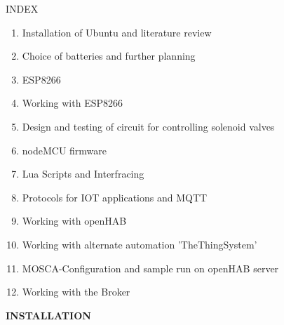 \documentclass[16pt]{article}
\begin{document}
\begin{tabbing}
	\hspace{5cm}
        \LARGE{INDEX}                %
\end{tabbing}

\vspace{0.5cm}

\begin{enumerate}
\item
  Installation of Ubuntu and literature review
\item
  Choice of batteries and further planning
\item
  ESP8266
\item
  Working with ESP8266 
\item
  Design and testing of circuit for controlling solenoid valves
\item
  nodeMCU firmware
\item
  Lua Scripts and Interfracing
\item
  Protocols for IOT applications and MQTT
\item
  Working with openHAB
\item
  Working with alternate automation 'TheThingSystem'
\item
  MOSCA-Configuration and sample run on openHAB server
\item
  Working with the Broker
\end{enumerate}


\vspace{10.3cm}


{\textbf{\LARGE{INSTALLATION} }   }

\vspace{1cm}                                    %
\end{document}

